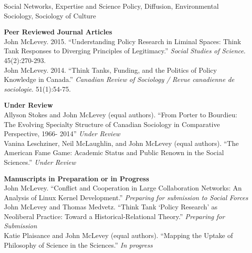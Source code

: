 \documentclass[9pt,usenames,dvipsnames]{article}
\begin{document}

\noindent Social Networks, Expertise and Science Policy, Diffusion, Environmental Sociology, Sociology of Culture \\
 

\ind \textbf{Peer Reviewed Journal Articles} \\

\ind John McLevey. 2015. ``Understanding Policy Research in Liminal Spaces: Think Tank Responses to Diverging Principles of Legitimacy.'' \emph{Social Studies of Science}. 45(2):270-293. \\

\ind John McLevey. 2014. ``Think Tanks, Funding, and the Politics of Policy Knowledge in Canada.'' \emph{Canadian Review of Sociology / Revue canadienne de sociologie}. 51(1):54-75.\\


\ind \textbf{Under Review} \\

\ind Allyson Stokes and John McLevey (equal authors). ``From Porter to Bourdieu: The Evolving Specialty Structure of Canadian Sociology in Comparative Perspective, 1966- 2014'' \emph{Under Review} \\

\ind Vanina Leschziner, Neil McLaughlin, and John McLevey (equal authors). ``The American Fame Game: Academic Status and Public Renown in the Social Sciences.'' \emph{Under Review} \\ 

\pagebreak

\ind \textbf{Manuscripts in Preparation or in Progress} \\

\ind John McLevey. ``Conflict and Cooperation in Large Collaboration Networks: An Analysis of Linux Kernel Development.'' \emph{Preparing for submission to Social Forces} \\

\ind John McLevey and Thomas Medvetz. ``Think Tank ‘Policy Research' as Neoliberal Practice: Toward a Historical-Relational Theory.'' \emph{Preparing for Submission}\\

\ind Katie Plaisance and John McLevey (equal authors). ``Mapping the Uptake of Philosophy of Science in the Sciences.'' \emph{In progress}\\
\end{document}

